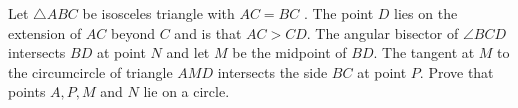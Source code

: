 Let $\triangle {ABC} $ be isosceles triangle with $AC=BC$ . The point $D$ lies on the extension of $AC$ beyond $C$ and is that $AC>CD$. The angular bisector of $ \angle BCD $ intersects $BD$ at point $N$ and let $M$ be the midpoint of $BD$. The tangent at $M$ to the circumcircle of triangle $AMD$ intersects the side $BC$ at point $P$. Prove that points $A,P,M$ and $N$ lie on a circle.